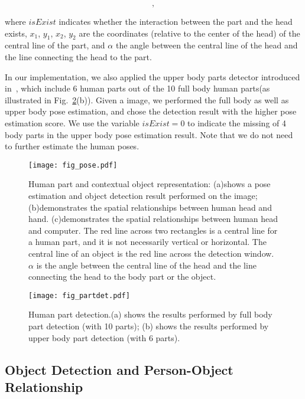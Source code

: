 \documentclass{article}
\begin{document}
\begin{equation}[isExist,x_1,y_1,x_2,y_2,\alpha],
\end{equation}

\noindent where $isExist$ indicates whether the interaction between the part and the head exists, $x_1$, $y_1$, $x_2$, $y_2$ are the coordinates (relative to the center of the head) of the central line of the part, and $\alpha$ the angle between the central line of the head and the line connecting the head to the part.

In our implementation, we also applied the upper body parts detector introduced in~\cite{XuReID13}, which include 6 human parts out of the 10 full body human parts(as illustrated in Fig.~\ref{fig:partdet}(b)).  Given a image, we performed the full body as well as upper body pose estimation, and chose the detection result with the higher pose estimation score.  We use the variable $isExist = 0$ to indicate the missing of 4 body parts in the upper body pose estimation result. Note that we do not need to further estimate the human poses.


\begin{figure}[htpb]
\centering
\texttt{[image: fig\_pose.pdf]}
\vspace{-10mm}
\caption{Human part and contextual object representation: (a)shows a pose estimation and object detection result performed on the image; (b)demonstrates the spatial relationships between human head and hand. (c)demonstrates the spatial relationships between human head and computer.  The red line across two rectangles is a central line for a human part, and it is not necessarily vertical or horizontal. The central line of an object is the red line across the detection window. $\alpha$ is the angle between the central line of the head and the line connecting the head to the body part or the object.}
\label{fig:pose}
\end{figure}

\begin{figure}[htpb]
\centering
\texttt{[image: fig\_partdet.pdf]}
\vspace{-10mm}
\caption{Human part detection.(a) shows the results performed by full body part detection (with 10 parts); (b) shows the results performed by upper body part detection (with 6 parts).}
\label{fig:partdet}
\end{figure}

\subsection{Object Detection and Person-Object Relationship}
\end{document}

